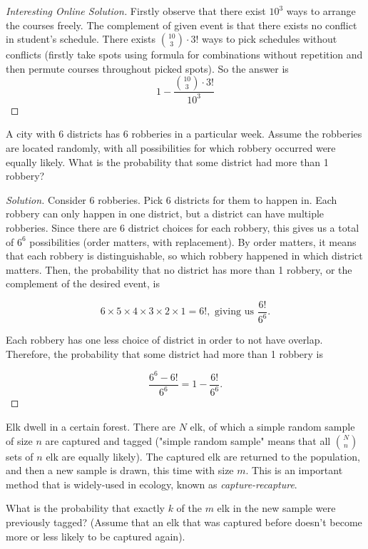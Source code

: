 \documentclass[10pt]{article}
\newenvironment{problem}[2][Problem]{\begin{trivlist}
\item[\hskip \labelsep {\bfseries #1}\hskip \labelsep {\bfseries #2.}]}{\end{trivlist}}
\begin{document}
\begin{proof}[Interesting Online Solution]

Firstly observe that there exist $10^3$ ways to arrange the courses freely. The complement of given event is that there exists no conflict in student's schedule. There exists \(\binom{10}{3} \cdot 3!\) ways to pick schedules without conflicts (firstly take spots using formula for combinations without repetition and then permute courses throughout picked spots). So the answer is
\[
1 - \dfrac{\binom{10}{3} \cdot 3!}{10^3}
\]
\end{proof}
\begin{problem}{4} 
A city with 6 districts has 6 robberies in a particular week. Assume the robberies are located randomly, with all possibilities for which robbery occurred were equally likely. What is the probability that some district had more than 1 robbery?
\end{problem}

\begin{proof}[Solution]

Consider 6 robberies. Pick 6 districts for them to happen in. Each robbery can only happen in one district, but a district can have multiple robberies. Since there are 6 district choices for each robbery, this gives us a total of $6^6$ possibilities (order matters, with replacement). By order matters, it means that each robbery is distinguishable, so which robbery happened in which district matters. Then, the probability that no district has more than 1 robbery, or the complement of the desired event, is 

\[
6 \times 5 \times 4 \times 3 \times 2 \times 1 = 6!, \text{ giving us } \frac{6!}{6^6}.
\]

Each robbery has one less choice of district in order to not have overlap. Therefore, the probability that some district had more than 1 robbery is 

\[
\frac{6^6 - 6!}{6^6} = 1 - \frac{6!}{6^6}.
\]

\end{proof}

\begin{problem}{5} 
Elk dwell in a certain forest. There are $N$ elk, of which a simple random sample of size $n$ are captured and tagged ("simple random sample" means that all \(\binom{N}{n}\) sets of $n$ elk are equally likely). The captured elk are returned to the population, and then a new sample is drawn, this time with size $m$. This is an important method that is widely-used in ecology, known as \textit{capture-recapture}.

What is the probability that exactly $k$ of the $m$ elk in the new sample were previously tagged? (Assume that an elk that was captured before doesn't become more or less likely to be captured again).
\end{problem}
\end{document}

